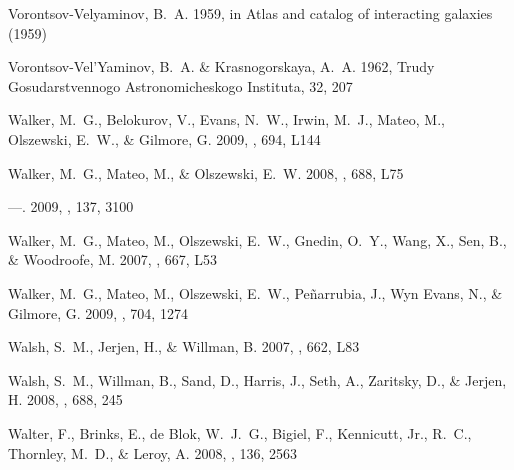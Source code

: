 \documentclass[manuscript]{aastex}
\begin{document}
\begin{thebibliography}{381}
{Vorontsov-Velyaminov}, B.~A. 1959, in Atlas and catalog of interacting
  galaxies (1959)

{Vorontsov-Vel'Yaminov}, B.~A. \& {Krasnogorskaya}, A.~A. 1962, Trudy
  Gosudarstvennogo Astronomicheskogo Instituta, 32, 207

{Walker}, M.~G., {Belokurov}, V., {Evans}, N.~W., {Irwin}, M.~J., {Mateo}, M.,
  {Olszewski}, E.~W., \& {Gilmore}, G. 2009{}, \apjl, 694, L144

{Walker}, M.~G., {Mateo}, M., \& {Olszewski}, E.~W. 2008, \apjl, 688, L75

---. 2009{}, \aj, 137, 3100

{Walker}, M.~G., {Mateo}, M., {Olszewski}, E.~W., {Gnedin}, O.~Y., {Wang}, X.,
  {Sen}, B., \& {Woodroofe}, M. 2007, \apjl, 667, L53

{Walker}, M.~G., {Mateo}, M., {Olszewski}, E.~W., {Pe{\~n}arrubia}, J., {Wyn
  Evans}, N., \& {Gilmore}, G. 2009{}, \apj, 704, 1274

{Walsh}, S.~M., {Jerjen}, H., \& {Willman}, B. 2007{}, \apjl, 662,
  L83

{Walsh}, S.~M., {Willman}, B., {Sand}, D., {Harris}, J., {Seth}, A.,
  {Zaritsky}, D., \& {Jerjen}, H. 2008, \apj, 688, 245

{Walter}, F., {Brinks}, E., {de Blok}, W.~J.~G., {Bigiel}, F., {Kennicutt},
  Jr., R.~C., {Thornley}, M.~D., \& {Leroy}, A. 2008, \aj, 136, 2563


\end{thebibliography}
\end{document}
